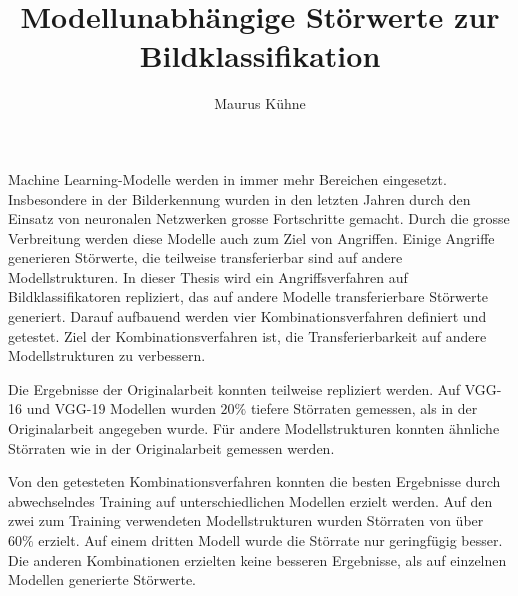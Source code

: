 \documentclass{FFHS_Thesis_Additions/ffhsthesis}
\begin{document}
\title{Modellunabhängige Störwerte zur Bildklassifikation}
\subtitle{} %
\author{Maurus Kühne}


\maketitle



\begin{zusammenfassung}

Machine Learning-Modelle werden in immer mehr Bereichen eingesetzt. Insbesondere in der Bilderkennung wurden in den letzten Jahren durch den Einsatz von neuronalen Netzwerken grosse Fortschritte gemacht. Durch die grosse Verbreitung werden diese Modelle auch zum Ziel von Angriffen. Einige Angriffe generieren Störwerte, die teilweise transferierbar sind auf andere Modellstrukturen. In dieser Thesis wird ein Angriffsverfahren auf Bildklassifikatoren repliziert, das auf andere Modelle transferierbare Störwerte generiert. Darauf aufbauend werden vier Kombinationsverfahren definiert und getestet. Ziel der Kombinationsverfahren ist,    die Transferierbarkeit auf andere Modellstrukturen zu verbessern.

Die Ergebnisse der Originalarbeit konnten teilweise repliziert werden. Auf VGG-16 und VGG-19 Modellen wurden $20\%$ tiefere Störraten gemessen, als in der Originalarbeit angegeben wurde. Für andere Modellstrukturen konnten ähnliche Störraten wie in der Originalarbeit gemessen werden.

Von den getesteten Kombinationsverfahren konnten die besten Ergebnisse durch abwechselndes Training auf unterschiedlichen Modellen erzielt werden. Auf den zwei zum Training verwendeten Modellstrukturen wurden Störraten von über $60\%$ erzielt. Auf einem dritten Modell wurde die Störrate nur geringfügig besser. Die anderen Kombinationen erzielten keine besseren Ergebnisse, als auf einzelnen Modellen generierte Störwerte.

\end{zusammenfassung}
\end{document}
